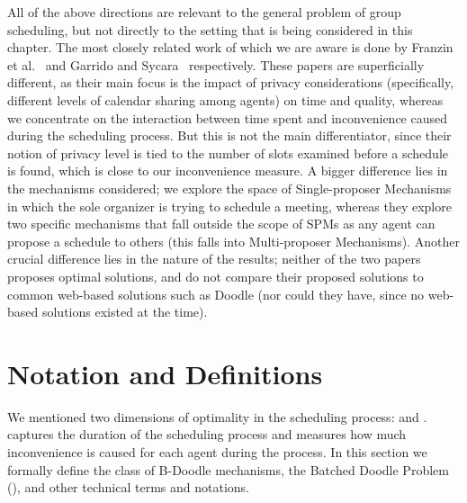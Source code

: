 All of the above directions are relevant to the general problem of group scheduling, but not directly to the setting that is being considered in this chapter. The most closely related work of which we are aware is done by Franzin et al.~\cite{franzin04} and Garrido and Sycara~\cite{garrido1996multi} respectively. These papers are superficially different, as their main focus is the impact of privacy considerations (specifically, different levels of calendar sharing among agents) on time and quality, whereas we concentrate on the interaction between time spent and inconvenience caused during the scheduling process. But this is not the main differentiator, since their notion of privacy level is tied to the number of slots examined before a schedule is found, which is close to our inconvenience measure. A bigger difference lies in the mechanisms considered; we explore the space of Single-proposer Mechanisms in which the sole organizer is trying to schedule a meeting, whereas they explore two specific mechanisms that fall outside the scope of SPMs as any agent can propose a schedule to others (this falls into Multi-proposer Mechanisms). Another crucial difference lies in the nature of the results; neither of the two papers proposes optimal solutions, and do not compare their proposed solutions to common web-based solutions such as Doodle (nor could they have, since no web-based solutions existed at the time).





\section{Notation and Definitions}

We mentioned two dimensions of optimality in the scheduling process: \Times and \Inconvenience.
\Times captures the duration of the scheduling process and \Inconveniences measures how much inconvenience is caused for each agent during the process.
In this section we formally define the class of B-Doodle mechanisms, the Batched Doodle Problem (\BDP), and other technical terms and notations.


